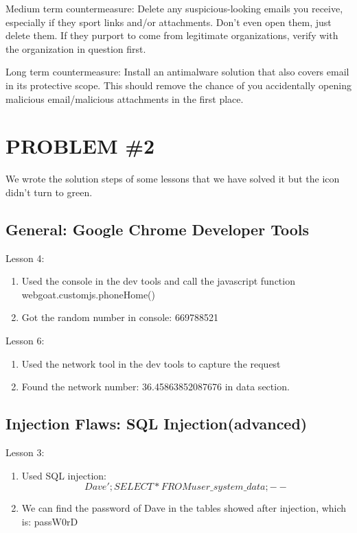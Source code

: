 \documentclass[conference]{IEEEtran}
\begin{document}
Medium term countermeasure:
Delete any suspicious-looking emails you receive, especially if they sport links and/or attachments. Don’t even open them, just delete them. If they purport to come from legitimate organizations, verify with the organization in question first.

Long term countermeasure:
Install an antimalware solution that also covers email in its protective scope. This should remove the chance of you accidentally opening malicious email/malicious attachments in the first place.

\section{PROBLEM \#2}
We wrote the solution steps of some lessons that we have solved it but the icon didn't turn to green.
\subsection{General: Google Chrome Developer Tools}

Lesson 4:
\begin{enumerate}
\item  Used the console in the dev tools and call the javascript function webgoat.customjs.phoneHome()
\item Got the random number in console: 669788521
\end{enumerate}

Lesson 6:
\begin{enumerate}
\item  Used the network tool in the dev tools to capture the request
\item Found the network number: 36.45863852087676 in data section.
\end{enumerate}

\subsection{Injection Flaws: SQL Injection(advanced)}
Lesson 3:
\begin{enumerate}
\item  Used SQL injection:
\begin{equation}
Dave'; SELECT * FROM user\_system\_data;--
\end{equation}
\item We can find the password of Dave in the tables showed after injection, which is: passW0rD
\end{enumerate}
\end{document}
